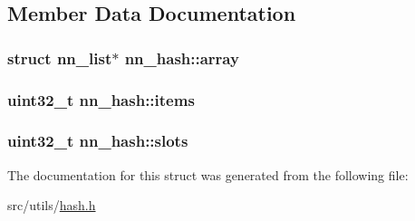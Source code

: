 \subsection{Member Data Documentation}
\subsubsection[{array}]{\setlength{\rightskip}{0pt plus 5cm}struct {\bf nn\+\_\+list}$\ast$ nn\+\_\+hash\+::array}\hypertarget{structnn__hash_a2ba7047174afe682c1613286020015e4}{}\label{structnn__hash_a2ba7047174afe682c1613286020015e4}
\subsubsection[{items}]{\setlength{\rightskip}{0pt plus 5cm}uint32\+\_\+t nn\+\_\+hash\+::items}\hypertarget{structnn__hash_ad68a8fd4c0707eddc75558b3de0b8ff9}{}\label{structnn__hash_ad68a8fd4c0707eddc75558b3de0b8ff9}
\subsubsection[{slots}]{\setlength{\rightskip}{0pt plus 5cm}uint32\+\_\+t nn\+\_\+hash\+::slots}\hypertarget{structnn__hash_a09c079149c424febf2b1cc5f639eaeac}{}\label{structnn__hash_a09c079149c424febf2b1cc5f639eaeac}


The documentation for this struct was generated from the following file\+:\begin{DoxyCompactItemize}
\item 
src/utils/\hyperlink{hash_8h}{hash.\+h}\end{DoxyCompactItemize}
